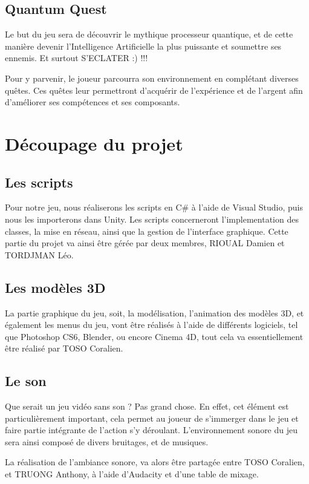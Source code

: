 \documentclass[A4paper,11pt]{article}
\begin{document}
\subsection{Quantum Quest}
Le but du jeu sera de d\'ecouvrir le mythique processeur quantique, et de cette mani\`ere devenir l'Intelligence Artificielle la plus puissante et soumettre ses ennemis. Et surtout S'ECLATER :) !!!

Pour y parvenir, le joueur parcourra son environnement en compl\'etant diverses qu\^etes. Ces qu\^etes leur permettront d'acqu\'erir de l'exp\'erience et de l'argent afin d'am\'eliorer ses comp\'etences et ses composants.


\section{D\'ecoupage du projet}

\subsection{Les scripts}
Pour notre jeu, nous r\'ealiserons les scripts en C\# \`a l'aide de Visual Studio, puis nous les importerons dans Unity.
Les scripts concerneront l'implementation des classes, la mise en r\'eseau, ainsi que la gestion de l'interface graphique.
Cette partie du projet va ainsi \^etre g\'er\'ee par deux membres, RIOUAL Damien et TORDJMAN L\'eo.
\subsection{Les mod\`eles 3D}
La partie graphique du jeu, soit, la mod\'elisation, l'animation des mod\`eles 3D, et \'egalement les menus du jeu, vont \^etre r\'ealis\'es \`a l'aide de diff\'erents logiciels, tel que Photoshop CS6, Blender, ou encore Cinema 4D, tout cela va essentiellement \^etre r\'ealis\'e par TOSO Coralien.
\subsection{Le son}
Que serait un jeu vid\'eo sans son ? Pas grand chose. En effet, cet \'el\'ement est particuli\`erement important, cela permet au joueur de s'immerger dans le jeu et faire partie int\'egrante de l'action s'y d\'eroulant. L'environnement sonore du jeu sera ainsi compos\'e de divers bruitages, et de musiques.

La r\'ealisation de l'ambiance sonore, va alors \^etre partag\'ee entre TOSO Coralien, et TRUONG Anthony, \`a l'aide d'Audacity et d'une table de mixage.
\newpage
\end{document}
